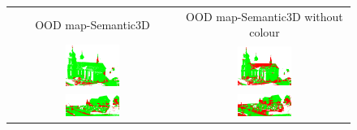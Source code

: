     \begin{figure}[h!]
        \centering
        \begin{tabular}{cc}
            OOD map-Semantic3D & OOD map-Semantic3D without colour \\
            \includegraphics[width=0.33\textwidth, height=0.18\textheight]{images/ood_imgs/sem3d_of/prob/fout_sem3d_OOD_1.pdf}&
            \includegraphics[width=0.33\textwidth, height=0.18\textheight]{images/ood_imgs/sem3d_of/prob/fout_sem3d_of_OOD_1.pdf}\\

            \includegraphics[width=0.33\textwidth, height=0.18\textheight]{images/ood_imgs/sem3d_of/prob/fout_sem3d_OOD_2.pdf}&
            \includegraphics[width=0.33\textwidth, height=0.18\textheight]{images/ood_imgs/sem3d_of/prob/fout_sem3d_of_OOD_2.pdf}\\


\end{tabular}
\end{figure}

